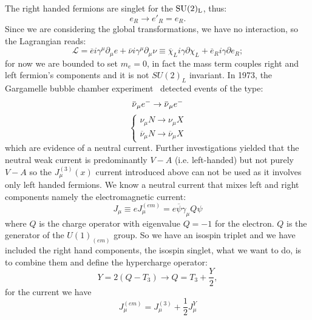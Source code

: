 The right handed fermions are singlet for the $\mathrm{SU}(2)_\mathrm{L}$, thus:
\begin{equation}
  e_{R} \to e'_{R}= e_{R}.
\end{equation}
Since we are considering the global transformations, we have no interaction, so
the Lagrangian reads:
\begin{equation}
  \label{eq:2}
  \mathcal{L} = \overbar{e} i \gamma^{\mu} \partial_{\mu} e + \overbar{\nu} i
  \gamma^{\mu} \partial_{\mu} \nu \equiv \overbar{\chi}_{L} i
  \gamma \partial \chi_{L} + \overbar{e}_{R} i \gamma \partial e_{R};
\end{equation}
for now we are bounded to set $m_{e} = 0$, in fact the mass term couples right
and left fermion's components and it is not $SU(2)_{L}$ invariant.  In 1973, the
Gargamelle bubble chamber experiment~\cite{Gargamelle} detected events of the
type:
\begin{equation}
  \label{eq:3}
  \overbar{\nu}_{\mu}\eminus \rightarrow \overbar{\nu}_{\mu}\eminus \\
\end{equation}
\begin{equation}
  \label{eq:4}
  \begin{cases}
    \nu_{\mu} N \rightarrow \nu_{\mu} X \\
    \overbar{\nu}_{\mu} N \rightarrow \overbar{\nu}_{\mu} X
  \end{cases}
\end{equation}
which are evidence of a neutral current. Further investigations yielded that the
neutral weak current is predominantly $V-A$ (i.e. left-handed) but not purely
$V-A$ so the $J^{(3)}_{\mu}(x)$ current introduced above can not be used as it
involves only left handed fermions.  We know a neutral current that mixes left
and right components namely the electromagnetic current:
\begin{equation}
  \label{eq:5}
  J_{\mu} \equiv e J_{\mu}^{(em)} = e \overbar{\psi} \gamma_{\mu} Q \psi
\end{equation}
where $Q$ is the charge operator with eigenvalue $Q = -1$ for the electron. $Q$
is the generator of the $U(1)_{(em)}$ group. So we have an isospin triplet and
we have included the right hand components, the isospin singlet, what we want to
do, is to combine them and define the hypercharge operator:
\begin{equation}
  \label{eq:6}
  Y = 2 ( Q - T_{3}) \rightarrow Q = T_{3} + \frac{Y}{2},
\end{equation}
for the current we have
\begin{equation}
  \label{eq:7}
  J_{\mu}^{(em)} = J_{\mu}^{(3)} + \frac{1}{2} J_{\mu}^{Y}
\end{equation}
